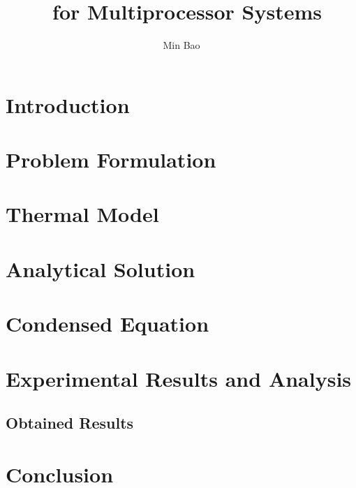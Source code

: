 \documentclass[11pt,a4paper]{article}
\author{Min Bao}
\title{\ssdtc\ for Multiprocessor Systems}
\begin{document}
  \maketitle

  \section{Introduction}
  

  \section{Problem Formulation}
  

  \section{Thermal Model}
  

  \section{Analytical Solution}
  

  \section{Condensed Equation}
  

  \section{Experimental Results and Analysis} \label{sec:experimental-results}
  

  \subsection{Obtained Results}

  \section{Conclusion}

  
\end{document}
